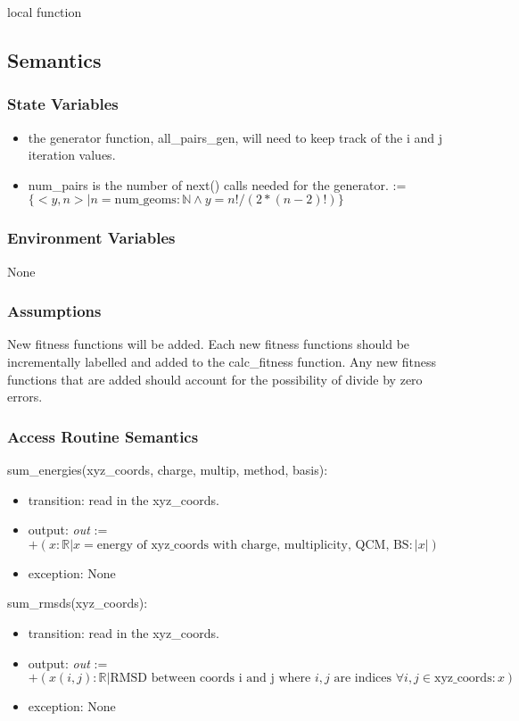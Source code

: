 \documentclass[12pt, titlepage]{article}
\begin{document}
\noindent * local function

\subsection{Semantics}

\subsubsection{State Variables}

\begin{itemize}
	\item the generator function, all\_pairs\_gen, will need to keep track of 
	the i and j iteration values.
	\item num\_pairs is the number of next() calls needed for the generator. := 
	$\{<y,n> | n = \text{num\_geoms} : \mathbb{N} \land y = n!/(2*(n-2)!) \}$
\end{itemize}

\subsubsection{Environment Variables}

None

\subsubsection{Assumptions}

New fitness functions will be added. Each new fitness functions should be 
incrementally labelled and added to the calc\_fitness function. Any new 
fitness functions that are added should account for the possibility of divide 
by zero errors.

\subsubsection{Access Routine Semantics}

\noindent sum\_energies(xyz\_coords, charge, multip, method, basis):
\begin{itemize}
	\item transition: read in the xyz\_coords. 
	\item output: \textit{out} := $+(x: \mathbb{R}|x = \text{energy of 
		xyz\_coords with charge, multiplicity, QCM, BS}: |x|)$
	\item exception: None
\end{itemize}

\noindent sum\_rmsds(xyz\_coords):
\begin{itemize}
	\item transition: read in the xyz\_coords.
	\item output: \textit{out} := $+(x(i,j): \mathbb{R}| \text{RMSD between 
		coords i and j where } i,j \text{ are indices } \forall i,j \in 
	\text{xyz\_coords}: x)$
	\item exception: None
\end{itemize}
\end{document}
